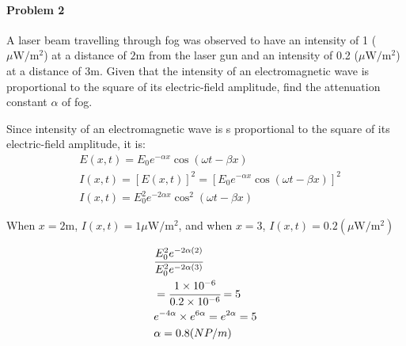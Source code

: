\documentclass[12pt]{scrartcl}
\begin{document}
{{\paragraph{Problem 2} 
A laser beam travelling through fog was observed to have an intensity of 1 ($\mu \si{\watt}/ \si{\meter}^2$) at a distance of $2 \si{\meter}$ from the laser gun and an intensity of 0.2 ($\mu \si{\watt}/ \si{\meter}^2$) at a distance of $3 \si{\meter}$. Given that the intensity of an electromagnetic wave is proportional to the square of its electric-field amplitude, find the attenuation constant $\alpha$ of fog. 

Since intensity of an electromagnetic wave is s proportional to the square of its electric-field amplitude, it is:
\begin{align*}
& E(x,t) = E_0e^{-\alpha x}\cos(\omega t - \beta x) \\
& I(x,t) = [E(x,t)]^2 = [ E_0e^{-\alpha x}\cos(\omega t - \beta x) ]^2 	\\
& I(x,t) = E_0^2e^{-2\alpha x}\cos^2(\omega t - \beta x)
\end{align*}

When $x=2 \si{\meter}$, $I(x,t)=1 \mu \si{\watt}/ \si{\meter}^2$, and when $x=3$, $I(x,t)=0.2 (\mu \si{\watt}/ \si{\meter}^2)$

\begin{align*}
& \cfrac{E_0^2e^{-2\alpha(2)}}{E_0^2e^{-2\alpha(3)}} \\
&=\cfrac{1 \times 10^{-6}}{0.2 \times 10^{-6}}=5 \\
& e^{-4\alpha} \times e^{6\alpha}=e^{2\alpha}=5 \\
& \alpha = 0.8 (NP/m)
\end{align*}
}}
\end{document}
